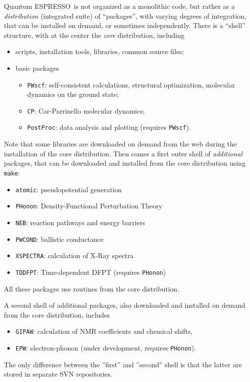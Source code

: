 \documentclass[12pt,a4paper]{article}
\def\qe{{\sc Quantum ESPRESSO}}
\begin{document}
\qe\ is not organized as a monolithic code, but rather as a
{\em distribution} (integrated suite) of ``packages'', with 
varying degrees of integration, that can be installed on demand,
or sometimes independently. There is a ``shell'' structure,
with at the center the {\em core} distribution, including
\begin{itemize}
\item scripts, installation tools, libraries, common source files; 
\item basic packages
\begin{itemize}
\item \texttt{PWscf}: self-consistent calculations, structural optimization,
molecular dynamics on the ground state;
\item \texttt{CP}: Car-Parrinello molecular dynamics;
\item \texttt{PostProc}: data analysis and plotting (requires \texttt{PWscf}).
\end{itemize}
\end{itemize}
Note that some libraries are downloaded on demand from the web
during the installation of the core distribution. Then comes a first
outer shell of {\em additional} packages, that can be downloaded and 
installed from the core distribution using \texttt{make}:
\begin{itemize}
\item \texttt{atomic}: pseudopotential generation
\item \texttt{PHonon}: Density-Functional Perturbation Theory
\item \texttt{NEB}: reaction pathways and energy barriers 
\item \texttt{PWCOND}: ballistic conductance
\item \texttt{XSPECTRA}: calculation of X-Ray spectra
\item \texttt{TDDFPT}: Time-dependent DFPT (requires \texttt{PHonon})
\end{itemize}
All these packages use routines from the core distribution.

A second shell of additional packages, also downloaded and installed 
on demand from the core distribution, includes
\begin{itemize}
\item \texttt{GIPAW}: calculation of NMR coefficients and chemical shifts,
\item \texttt{EPW}: electron-phonon (under development, 
requires \texttt{PHonon}).
\end{itemize}
The only difference between the ''first'' and ''second'' shell is that
the latter are stored in separate SVN repositories.
\end{document}

